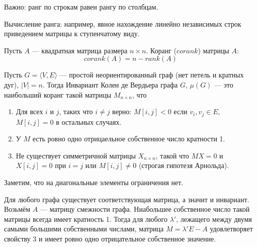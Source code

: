 Важно: ранг по строкам равен рангу по столбцам. 

Вычисление ранга: например, явное нахождение линейно независимых строк приведением матрицы к ступенчатому виду.

\begin{definition}
Пусть $A$ --- квадратная матрица размера $n \times n$. Коранг ($corank$) матрицы $A$:
$$ corank(A) = n - rank(A)$$

\end{definition}

\begin{definition}
Пусть $G = \langle V,E \rangle$ --- простой неориентированный граф (нет петель и кратных дуг), $|V| = n$. Тогда Инвариант Колен де Вердьера графа $G$, $\mu(G)$ --- это наибольший коранг такой матрицы $M_{n\times n}$, что
\begin{enumerate}
  \item Для всех $i$ и $j$, таких что $i \neq j$ верно: $M[i,j] < 0$ если $v_i, v_j \in E$, $M[i,j] = 0$ в остальных случаях.
  \item У $M$ есть ровно одно отрицаельное собственное число кратности 1.
  \item Не существует симметричной матрицы $X_{n\times n}$, такой что $MX = 0$ и $X[i,j] = 0$ при $i=j$ или $M[i,j] \neq 0$ (строгая гипотезя Арнольда).
\end{enumerate} 

\end{definition}

Заметим, что на диагональные элементы ограничения нет.

Для любого графа существует соответствующая матрица, а значит и инвариант. Возьмём $A$ --- матрицу смежности графа. Ниабольшее собственное число такой матрицы всегда имеет кратность 1. Тогда для любого $\lambda'$, лежащего между двумя самыми большими собственными числами, матрица $M = \lambda'E - A$ удовлетворяет свойству 3 и имеет ровно одно отрицательное собственное значение.  


